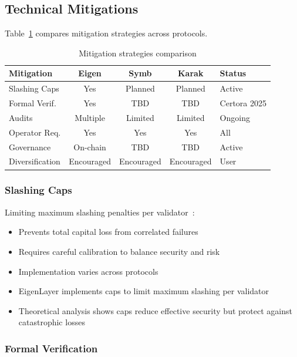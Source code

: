 \documentclass[runningheads]{llncs}
\begin{document}
\subsection{Technical Mitigations}

Table~\ref{tab:mitigation_comparison} compares mitigation strategies across protocols.

\begin{table}[!ht]
    \centering
    \scriptsize
    \caption{Mitigation strategies comparison}
    \label{tab:mitigation_comparison}
    \begin{tabular}{lcccp{2.5cm}}
        \toprule
        \textbf{Mitigation} & \textbf{Eigen} & \textbf{Symb} & \textbf{Karak} & \textbf{Status} \\
        \midrule
        Slashing Caps & Yes & Planned & Planned & Active \\
        Formal Verif. & Yes & TBD & TBD & Certora 2025 \\
        Audits & Multiple & Limited & Limited & Ongoing \\
        Operator Req. & Yes & Yes & Yes & All \\
        Governance & On-chain & TBD & TBD & Active \\
        Diversification & Encouraged & Encouraged & Encouraged & User \\
        \bottomrule
    \end{tabular}
\end{table}

\subsubsection{Slashing Caps}

Limiting maximum slashing penalties per validator~\cite{durvasula2024robust}:
\begin{itemize}
    \item Prevents total capital loss from correlated failures
    \item Requires careful calibration to balance security and risk
    \item Implementation varies across protocols
    \item EigenLayer implements caps to limit maximum slashing per validator
    \item Theoretical analysis shows caps reduce effective security but protect against catastrophic losses
\end{itemize}

\subsubsection{Formal Verification}
\end{document}

